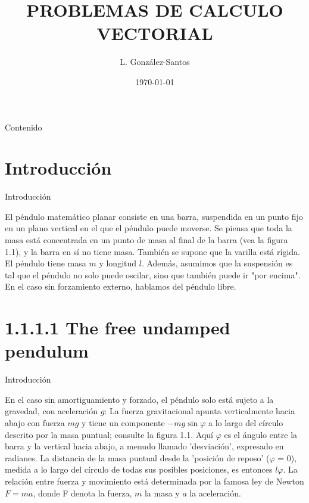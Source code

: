 \documentclass[11pt]{beamer}
\author[santosg172@gmail.com]{L. González-Santos\inst{1}}
\title[Aplicación a la IA]{PROBLEMAS DE CALCULO VECTORIAL}
\date{\today}
\begin{document}
	
	\begin{frame}
		\maketitle
	\end{frame}

	\begin{frame}{Contenido}
		\tableofcontents
	\end{frame}

	
	\section{Introducción}
		
		\begin{frame}{Introducción}
			\justifying
			
		El péndulo matemático planar consiste en una barra, suspendida en un punto fijo en un plano vertical en el que el péndulo puede moverse. Se piensa que toda la masa está concentrada en un punto de masa al final de la barra (vea la figura 1.1), y la barra en sí no tiene masa. También se supone que la varilla está rígida. El péndulo tiene masa $m$ y longitud $l$. Además, asumimos que la suspensión es tal que el péndulo no solo puede oscilar, sino que también puede ir "por encima". En el caso sin forzamiento externo, hablamos del péndulo libre.


		\end{frame}
	
\section{1.1.1.1 The free undamped pendulum}	

\begin{frame}{Introducción}
			\justifying
			
En el caso sin amortiguamiento y forzado, el péndulo solo está sujeto a la gravedad, con aceleración $g$: La fuerza gravitacional apunta verticalmente hacia abajo con fuerza $mg$ y tiene un componente $-mg \sin \varphi$ a lo largo del círculo descrito por la masa puntual; consulte la figura 1.1. Aquí $\varphi$ es el ángulo entre la barra y la vertical hacia abajo, a menudo llamado 'desviación', expresado en radianes. La distancia de la masa puntual desde la 'posición de reposo' ($\varphi$ = 0), medida a lo largo del círculo de todas sus posibles posiciones, es entonces $l \varphi$. La relación entre fuerza y movimiento está determinada por la famosa ley de Newton $F = ma$,  donde F denota la fuerza, $m$ la masa y $a$ la aceleración.


\end{frame}
	
\end{document}
